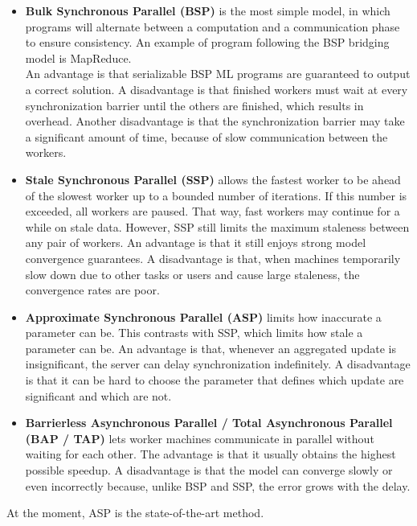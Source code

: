 \begin{itemize}
	\item \textbf{Bulk Synchronous Parallel (BSP)} is the most simple model, in which programs will alternate between a computation and a communication phase to ensure consistency\cite{Xing16}. An example of program following the BSP bridging model is MapReduce.\\
	An advantage is that serializable BSP ML programs are guaranteed to output a correct solution. A disadvantage is that finished workers must wait at every synchronization barrier until the others are finished, which results in overhead\cite{Chilimbi14}. Another disadvantage is that the synchronization barrier may take a significant amount of time, because of slow communication between the workers.
	\item \textbf{Stale Synchronous Parallel (SSP)} allows the fastest worker to be ahead of the slowest worker up to a bounded number of iterations. If this number is exceeded, all workers are paused. That way, fast workers may continue for a while on stale data. However, SSP still limits the maximum staleness between any pair of workers. An advantage is that it still enjoys strong model convergence guarantees. A disadvantage is that, when machines temporarily slow down due to other tasks or users and cause large staleness, the convergence rates are poor.
	\item \textbf{Approximate Synchronous Parallel (ASP)} limits how inaccurate a parameter can be. This contrasts with SSP, which limits how stale a parameter can be. An advantage is that, whenever an aggregated update is insignificant, the server can delay synchronization indefinitely. A disadvantage is that it can be hard to choose the parameter that defines which update are significant and which are not. \cite{Hsieh17}
	\item \textbf{Barrierless Asynchronous Parallel\cite{Han15} / Total Asynchronous Parallel\cite{Hsieh17} (BAP / TAP)} lets worker machines communicate in parallel without waiting for each other. The advantage is that it usually obtains the highest possible speedup. A disadvantage is that the model can converge slowly or even incorrectly because, unlike BSP and SSP, the error grows with the delay. \cite{Han15}
\end{itemize}
At the moment, ASP is the state-of-the-art method.


